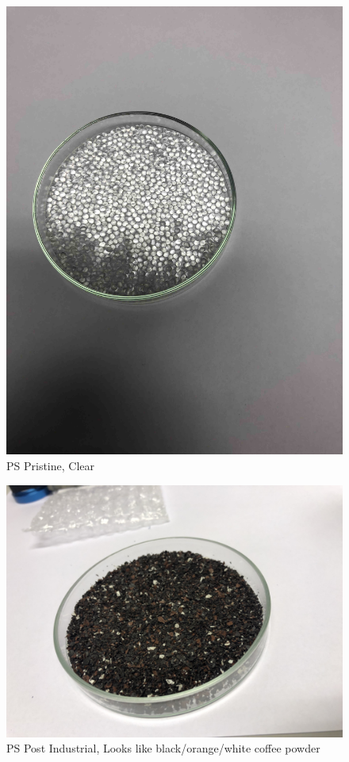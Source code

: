\begin{appendices}
\begin{figure}
    \centering
    \includegraphics[width = 12cm]{Images/appendix/PS-pristine.jpg}
    \caption[$\; \:$PS Pristine]{PS Pristine, Clear}
    \label{fig:ps-clear}
\end{figure}

\begin{figure}
    \centering
    \includegraphics[width = 12cm]{Images/appendix/PS-Regrind-(Post-Industrial-Plant-Trays).jpg}
    \caption[$\; \:$PS Post Industrial]{PS Post Industrial, Looks like black/orange/white coffee powder}
    \label{fig:ps-coffee}
\end{figure}


\end{appendices}
